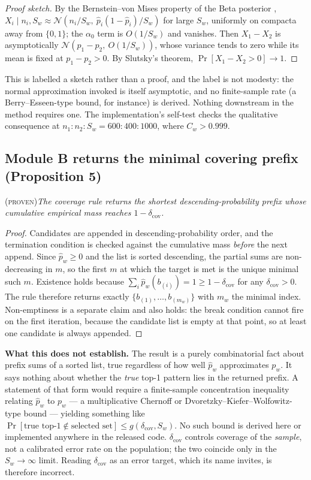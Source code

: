 \documentclass[preprint,11pt]{elsarticle}
\newcommand{\PROVEN}{\textsc{(proven)}}
\newcommand{\Cw}{C_w}
\newcommand{\dcov}{\delta_{\mathrm{cov}}}
\begin{document}
\begin{proof}[Proof sketch]
By the Bernstein--von Mises property of the Beta posterior
\cite[Ch.~10]{vandervaart1998},
$X_i\mid n_i,S_w\approx\mathcal{N}(n_i/S_w,\ \hat p_i(1-\hat p_i)/S_w)$
for large $S_w$, uniformly on compacta away from $\{0,1\}$; the
$\alpha_0$ term is $O(1/S_w)$ and vanishes. Then $X_1-X_2$ is
asymptotically $\mathcal{N}(p_1-p_2,\ O(1/S_w))$, whose variance tends to
zero while its mean is fixed at $p_1-p_2>0$. By Slutsky's theorem,
$\Pr[X_1-X_2>0]\to1$.
\end{proof}

\noindent
This is labelled a sketch rather than a proof, and the label is not
modesty: the normal approximation invoked is itself asymptotic, and no
finite-sample rate (a Berry--Esseen-type bound, for instance) is derived.
Nothing downstream in the method requires one. The implementation's
self-test checks the qualitative consequence at
$n_1{:}n_2{:}S_w=600{:}400{:}1000$, where $\Cw>0.999$.

\subsection{Module B returns the minimal covering prefix (Proposition 5)}
\PROVEN{}\quad\textit{The coverage rule returns the shortest
descending-probability prefix whose cumulative empirical mass reaches
$1-\dcov$.}

\begin{proof}
Candidates are appended in descending-probability order, and the
termination condition is checked against the cumulative mass \emph{before}
the next append. Since $\hat p_w\ge0$ and the list is sorted descending,
the partial sums are non-decreasing in $m$, so the first $m$ at which the
target is met is the unique minimal such $m$. Existence holds because
$\sum_i\hat p_w(b_{(i)})=1\ge1-\dcov$ for any $\dcov>0$. The rule
therefore returns exactly $\{b_{(1)},\dots,b_{(m_w)}\}$ with $m_w$ the
minimal index. Non-emptiness is a separate claim and also holds: the
break condition cannot fire on the first iteration, because the candidate
list is empty at that point, so at least one candidate is always
appended.
\end{proof}

\noindent
\textbf{What this does not establish.} The result is a purely
combinatorial fact about prefix sums of a sorted list, true regardless of
how well $\hat p_w$ approximates $p_w$. It says nothing about whether the
\emph{true} top-1 pattern lies in the returned prefix. A statement of
that form would require a finite-sample concentration inequality relating
$\hat p_w$ to $p_w$ --- a multiplicative Chernoff or
Dvoretzky--Kiefer--Wolfowitz-type bound --- yielding something like
$\Pr[\text{true top-1}\notin\text{selected set}]\le g(\dcov,S_w)$. No
such bound is derived here or implemented anywhere in the released code.
$\dcov$ controls coverage of the \emph{sample}, not a calibrated error
rate on the population; the two coincide only in the $S_w\to\infty$
limit. Reading $\dcov$ as an error target, which its name invites, is
therefore incorrect.
\end{document}
